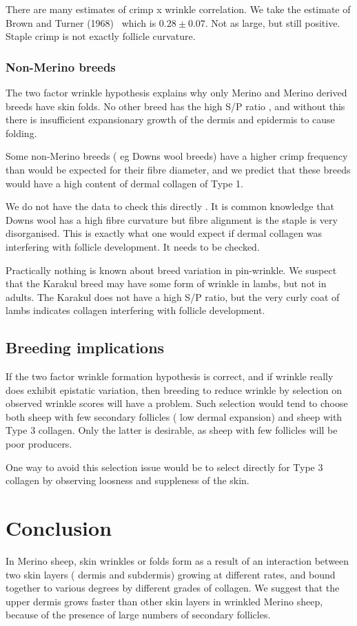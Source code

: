 \documentclass[titlepage]{article}  %
\begin{document}
There are many estimates  of crimp x wrinkle correlation. We take the estimate of Brown and Turner (1968)~\cite{brow:68} which is $0.28 \pm 0.07$. Not as large, but still positive. Staple crimp is not exactly follicle curvature. 

\subsubsection{Non-Merino breeds}
The two factor wrinkle hypothesis explains why only Merino and Merino derived breeds have skin folds. No other breed has the high S/P ratio , and without this there is insufficient expansionary growth of the dermis and epidermis to cause folding. 

Some non-Merino breeds ( eg Downs wool breeds) have a higher crimp frequency than would be expected for their fibre diameter, and we predict that these breeds  would have a high content of dermal collagen of Type 1.

We do not have the data to check this directly . It is common knowledge that Downs wool has a high fibre curvature but fibre alignment is the staple is very disorganised. This is exactly what one would expect if dermal collagen was interfering with follicle development. It needs to be checked.

Practically nothing is known about breed variation in pin-wrinkle.  We suspect that the Karakul breed may have some form of wrinkle in lambs, but not in adults.   The Karakul does not have a high S/P ratio, but the very curly coat of lambs indicates collagen interfering with follicle development.

\subsection{Breeding implications}
If the two factor wrinkle formation hypothesis is correct, and if wrinkle really does exhibit epistatic variation, then breeding to reduce wrinkle by selection on observed wrinkle scores will have a problem. Such selection would tend to choose both sheep with few secondary follicles ( low dermal expansion) and sheep with Type 3 collagen. Only the latter is desirable, as sheep with few follicles will be poor producers. 

One way to avoid this selection issue would be to select directly for Type 3 collagen by observing loosness and suppleness of the skin.  


\section{Conclusion}
 In Merino sheep, skin wrinkles or folds form as a result of an interaction between two skin layers ( dermis and subdermis) growing at different rates, and bound together to various degrees by different grades of collagen.  We suggest that the upper dermis grows faster than other skin layers in wrinkled Merino sheep, because of the presence of large numbers of secondary follicles. 
\end{document}
